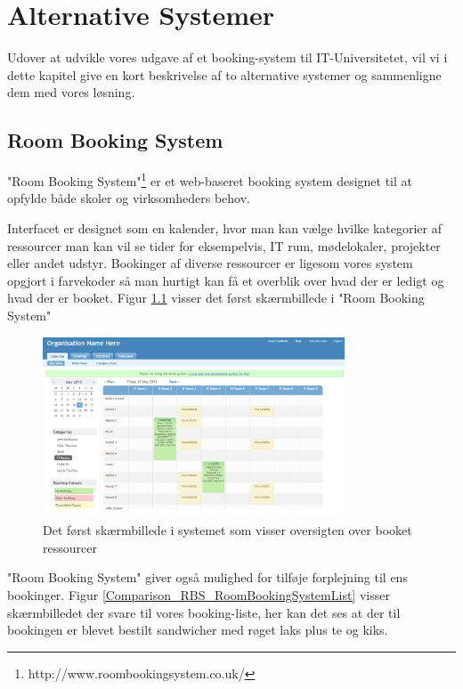 \chapter{Alternative Systemer}
\label{Comparison}
Udover at udvikle vores udgave af et booking-system til IT-Universitetet, vil vi i dette kapitel give en kort beskrivelse af to alternative  systemer og sammenligne dem med vores løsning.

\section{Room Booking System}
\label{Comparison_RBS}
"Room Booking System"\footnote{http://www.roombookingsystem.co.uk/} er et web-baseret booking system designet til at opfylde både skoler og virksomheders behov. 

Interfacet er designet som en kalender, hvor man kan vælge hvilke kategorier af ressourcer man kan vil se tider for eksempelvis, IT rum, mødelokaler, projekter eller andet udstyr. Bookinger af diverse ressourcer er ligesom vores system opgjort i farvekoder så man hurtigt kan få et overblik over hvad der er ledigt og hvad der er booket. Figur \ref{Comparison_RBS_RoomBookingSystem} visser det først skærmbillede i "Room Booking System"

\begin{figure}[h!]
  \centering
    \includegraphics[width=0.8\textwidth]{Appendix/GUI-Prototype/RoomBookingSystem}
  \caption{Det først skærmbillede i systemet som visser oversigten over booket ressourcer}
\label{Comparison_RBS_RoomBookingSystem}
\end{figure}

"Room Booking System" giver også mulighed for tilføje forplejning til ens bookinger. Figur \ref{Comparison_RBS_RoomBookingSystemList} visser skærmbilledet der svare til vores booking-liste, her kan det ses at der til bookingen er blevet bestilt sandwicher med røget laks plus te og kiks.

